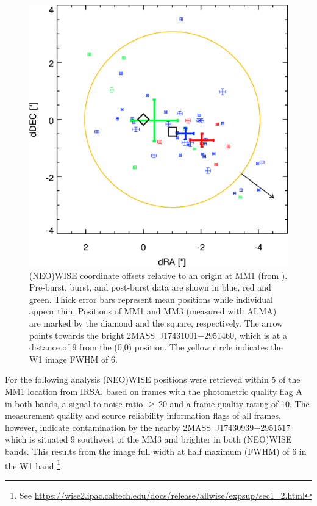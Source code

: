 \begin{figure}
    \centering
	\includegraphics[width=\columnwidth]{G358_dRA_dDEC.png}
	\caption{(NEO)WISE coordinate offsets relative to an origin at MM1 (from \cite{2019ApJ...881L..39B}). Pre-burst, burst, and post-burst data are shown in blue, red and green. Thick error bars represent mean positions while individual appear thin. Positions of MM1 and MM3 (measured with ALMA) are marked by the diamond and the square, respectively. The arrow points towards the bright 2MASS~J17431001$-$2951460, which is at a distance of 9 from the (0,0) position. The yellow circle indicates the W1 image FWHM of 6.
	}
 \label{fig:NW_pos}
\end{figure}

For the following analysis (NEO)WISE positions were retrieved within 5\arcsec{} of the MM1 location  from IRSA, based on frames with the photometric quality flag A in both bands, a signal-to-noise ratio ${\ge}$\,20 and a frame quality rating of 10. The measurement quality and source reliability information flags of all frames, however, indicate contamination by the nearby 2MASS~J17430939$-$2951517 which is situated 9 southwest of the MM3 and brighter in both (NEO)WISE bands.
This results from the image full width at half maximum (FWHM) of 6 in the W1 band
\footnote{See\,\,\url{https://wise2.ipac.caltech.edu/docs/release/allwise/expsup/sec1_2.html}}.

